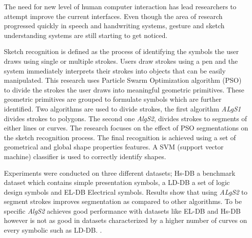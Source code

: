 \documentclass[11pt,doublespace]{SketchThesis}
\begin{document}
\begin{abstractpage}          


The need for new level of human computer interaction has lead researchers to attempt improve the current interfaces. Even though the area of research progressed quickly in speech and handwriting systems, gesture and sketch understanding systems are still starting to get noticed. 


Sketch recognition is defined as the process of identifying the symbols the user draws using single or multiple strokes. Users draw strokes using a pen and the system immediately interprets their strokes into objects that can be easily manipulated. This research uses Particle Swarm Optimization algorithm (PSO) to divide the strokes the user draws into meaningful geometric primitives. These geometric primitives are grouped to formulate symbols which are further identified. Two algorithms are used to divide strokes, the first algorithm \textit{ALgS1} divides strokes to polygons. The second one \textit{AlgS2}, divides strokes to segments of either lines or curves. The research focuses on the effect of PSO segmentations on the sketch recognition process. The final recognition is achieved using a set of geometrical and global shape properties features. A SVM (support vector machine) classifier is used to correctly identify shapes. 

Experiments were conducted on three different datasets; Hs-DB a benchmark dataset which contains simple presentation symbols, a LD-DB a set of logic design symbols and EL-DB Electrical symbols. Results show that using \textit{ALgS2} to segment strokes improves segmentation as compared to other algorithms. To be specific \textit{AlgS2} achieves good performance with datasets like EL-DB and Hs-DB however is not as good in datasets characterized by a higher number of curves on every symbolic such as LD-DB.
. %

\end{abstractpage}                              %
\end{document}
